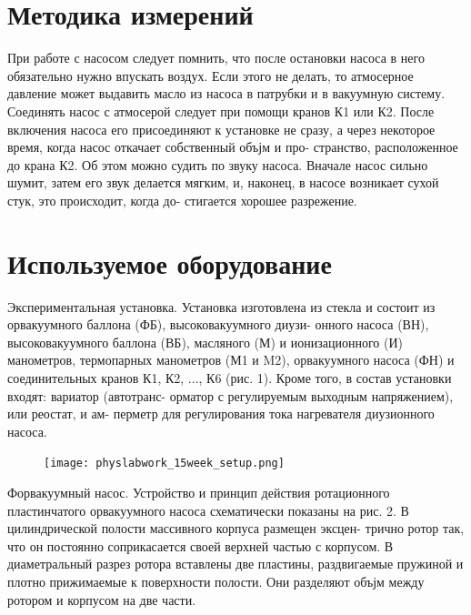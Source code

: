 \documentclass[a4paper,12pt]{article} %
\begin{document}
\section{Методика измерений}

При работе с насосом следует помнить, что после остановки насоса
в него обязательно нужно впускать воздух. Если этого не делать, то
атмосерное давление может выдавить масло из насоса в патрубки и в
вакуумную систему. Соединять насос с атмосерой следует при помощи
кранов К1 или К2.
После включения насоса его присоединяют к установке не сразу, а
через некоторое время, когда насос откачает собственный объјм и про-
странство, расположенное до крана К2. Об этом можно судить по звуку
насоса. Вначале насос сильно шумит, затем его звук делается мягким,
и, наконец, в насосе возникает сухой стук, это происходит, когда до-
стигается хорошее разрежение.

\section{Используемое оборудование}

Экспериментальная установка. Установка изготовлена из стекла и
состоит из орвакуумного баллона (ФБ), высоковакуумного диузи-
онного насоса (ВН), высоковакуумного баллона (ВБ), масляного (М) и
ионизационного (И) манометров, термопарных манометров (М1 и M2),
орвакуумного насоса (ФН) и соединительных кранов К1, К2, ..., К6
(рис. 1). Кроме того, в состав установки входят: вариатор (автотранс-
орматор с регулируемым выходным напряжением), или реостат, и ам-
перметр для регулирования тока нагревателя диузионного насоса. \\

\begin{figure}[H]
\begin{floatrow}
         {\texttt{[image: physlabwork\_15week\_setup.png]}}     
\end{floatrow}
\end{figure}

Форвакуумный насос. Устройство и принцип действия ротационного
пластинчатого орвакуумного насоса схематически показаны на рис. 2.
В цилиндрической полости массивного корпуса размещен эксцен-
трично ротор так, что он постоянно соприкасается своей верхней частью
с корпусом. В диаметральный разрез ротора вставлены две пластины,
раздвигаемые пружиной и плотно прижимаемые к поверхности полости.
Они разделяют объјм между ротором и корпусом на две части. \\
\end{document}
